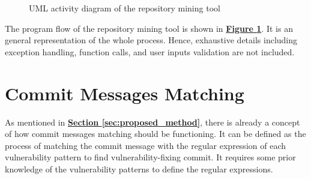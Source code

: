 \documentclass[12pt, a4paper]{report}
\begin{document}
\begin{figure}[H]
  \caption{UML activity diagram of the repository mining tool}
  \label{figure:activity_diagram}
\end{figure}

The program flow of the repository mining tool is shown in
\hyperref[figure:activity_diagram]{\textbf{Figure \ref*{figure:activity_diagram}}}. It is an general
representation of the whole process. Hence, exhaustive details including exception handling,
function calls, and user inputs validation are not included.

\section{Commit Messages Matching} \label{sec:design_commit_matching}
As mentioned in \hyperref[sec:proposed_method]{\textbf{Section \ref*{sec:proposed_method}}}, there
is already a concept of how commit messages matching should be functioning. It can be defined as the
process of matching the commit message with the regular expression of each vulnerability pattern to
find vulnerability-fixing commit. It requires some prior knowledge of the vulnerability patterns to
define the regular expressions.
\end{document}
